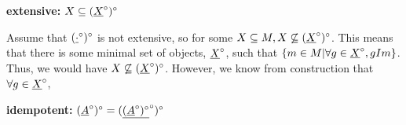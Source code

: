\documentclass[11pt]{article}
\begin{document}
\textbf{extensive:} $X \subseteq (\underline{X}^\circ)^\circ$



Assume that $(\underline{\cdot}^\circ)^\circ$ is not extensive, so for some $X \subseteq M, X \not \subseteq (\underline{X}^\circ)^\circ$. This means that there is some minimal set of objects, $\underline{X}^\circ$, such that $\{m\in M | \forall g \in \underline{X}^\circ, gIm \}$. Thus, we would have $X \not \subseteq (\underline{X}^\circ)^\circ$. However, we know from construction that $\forall g \in \underline{X}^\circ$,  


\textbf{idempotent:} $(\underline{A}^\circ)^\circ = (\underline{(\underline{A}^\circ)^\circ}^\circ)^\circ$
\end{document}
